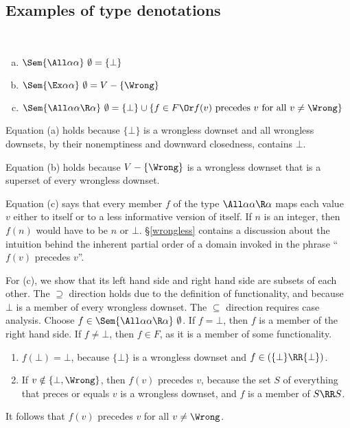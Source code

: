\documentclass{amsart}
\theoremstyle{definition}
\begin{document}
\subsection{Examples of type denotations}
\label{free-theorems}
~
\begin{enumerate}[(a)]
\item $\Sem{\All\alpha\alpha}~\emptyset=\{\bot\}$
\item $\Sem{\Ex\alpha\alpha}~\emptyset=V-\{\Wrong\}$
\item $\Sem{\All\alpha\alpha\R\alpha}~\emptyset=\{\bot\}\cup
\{f\in F
\Or
f(v)\text{ precedes }v\text{ for all }v\neq\Wrong
\}$
\end{enumerate}

Equation (a) holds because $\{\bot\}$ is a wrongless downset and
all wrongless downsets, by their nonemptiness and downward
closedness, contains $\bot$.

Equation (b) holds because $V-\{\Wrong\}$ is a wrongless downset
that is a superset of every wrongless downset.

Equation (c) says that every member $f$ of the type
$\All\alpha\alpha\R\alpha$ maps each value~$v$ either to itself
or to a less informative version of itself. If $n$ is an integer,
then $f(n)$ would have to be $n$ or $\bot$. \S\ref{wrongless}
contains a discussion about the intuition behind the inherent
partial order of a domain invoked in the phrase ``$f(v)$ precedes
$v$''.

For (c), we show that its left hand side and right hand side are
subsets of each other. The $\supseteq$ direction holds due to
the definition of functionality, and because $\bot$ is a member
of every wrongless downset. The $\subseteq$ direction requires
case analysis. Choose
$f\in\Sem{\All\alpha\alpha\R\alpha}~\emptyset$. If $f=\bot$, then
$f$ is a member of the right hand side. If $f\neq\bot$, then
$f\in F$, as it is a member of some functionality.
\begin{enumerate}
\item $f(\bot)=\bot$, because $\{\bot\}$ is a wrongless downset
and $f\in(\{\bot\}\RR\{\bot\})$.
\item If $v\notin\{\bot,\Wrong\}$, then $f(v)$ precedes $v$,
because the set $S$ of everything that preces or equals $v$ is a
wrongless downset, and $f$ is a member of $S\RR S$.
\end{enumerate}
It follows that $f(v)$ precedes $v$ for all $v\ne\Wrong$.
\end{document}
